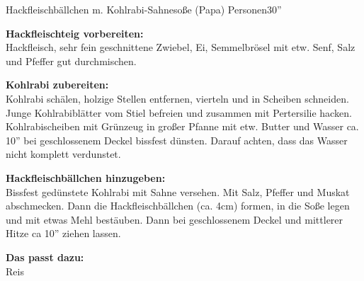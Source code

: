 \begin{MyRecipe}{Hackfleischbällchen m. Kohlrabi-Sahnesoße (Papa)}{ Personen}{30''}
	
	
	\textbf{Hackfleischteig vorbereiten:}\\
	Hackfleisch, sehr fein geschnittene Zwiebel, Ei, Semmelbrösel mit etw. Senf, Salz und Pfeffer gut durchmischen.\par\bigskip
	

	\textbf{Kohlrabi zubereiten:}\\
	Kohlrabi schälen, holzige Stellen entfernen, vierteln und in Scheiben schneiden. Junge Kohlrabiblätter vom Stiel befreien und zusammen mit Pertersilie hacken. Kohlrabischeiben mit Grünzeug in großer Pfanne mit etw. Butter und Wasser ca. 10'' bei geschlossenem Deckel bissfest dünsten. Darauf achten, dass das Wasser nicht komplett verdunstet.\par\bigskip
	
	
	\textbf{Hackfleischbällchen hinzugeben:}\\
	Bissfest gedünstete Kohlrabi mit Sahne versehen. Mit Salz, Pfeffer und Muskat abschmecken. Dann die Hackfleischbällchen (ca. 4cm) formen, in die Soße legen und mit etwas Mehl bestäuben. Dann bei geschlossenem Deckel und mittlerer Hitze ca 10'' ziehen lassen.\par\bigskip
	
	\textbf{Das passt dazu:}\\
	Reis
	
\end{MyRecipe}